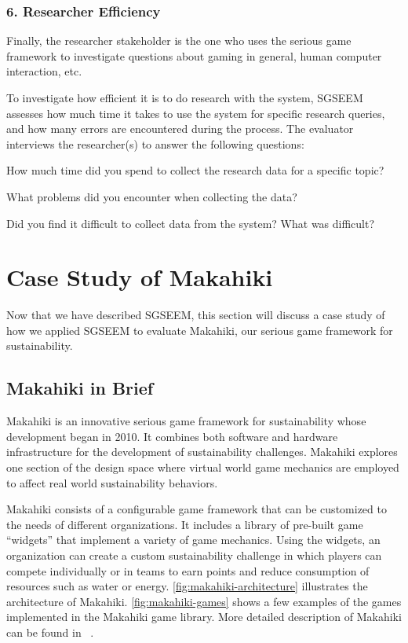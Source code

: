 \documentclass{sigchi}
\begin{document}
\subsubsection{6. Researcher Efficiency}

Finally, the researcher stakeholder is the one who uses the serious game framework to
investigate questions about gaming in general, human computer interaction, etc. 

To investigate how efficient it is to do research with the system, SGSEEM
assesses how much time it takes to use the system for specific research
queries, and how many errors are encountered during the process. The evaluator
interviews the researcher(s) to answer the following questions:
\begin{compactitem}
\item How much time did you spend to collect the research data for a
  specific topic?
\item What problems did you encounter when collecting the data?
\item Did you find it difficult to collect data from the system?
  What was difficult?
\end{compactitem}

\section{Case Study of Makahiki}

Now that we have described SGSEEM, this section will discuss
a case study of how we applied SGSEEM to evaluate Makahiki, our serious
game framework for sustainability. 

\subsection{Makahiki in Brief}

Makahiki is an innovative serious game framework for sustainability whose development
began in 2010. It combines both software and hardware infrastructure for the
development of sustainability challenges. Makahiki explores one section of the design
space where virtual world game mechanics are employed to affect real
world sustainability behaviors.

Makahiki consists of a configurable game framework that can be customized
to the needs of different organizations. It includes a library of
pre-built game ``widgets'' that implement a variety of game mechanics.
Using the widgets, an organization can create a custom sustainability
challenge in which players can compete individually or in teams to
earn points and reduce consumption of resources such as water or energy.
\autoref{fig:makahiki-architecture} illustrates the architecture of
Makahiki. \autoref{fig:makahiki-games} shows a few examples of the
games implemented in the Makahiki game library. More detailed
description of Makahiki can be found in ~\cite{csdl2-12-06}.
\end{document}

